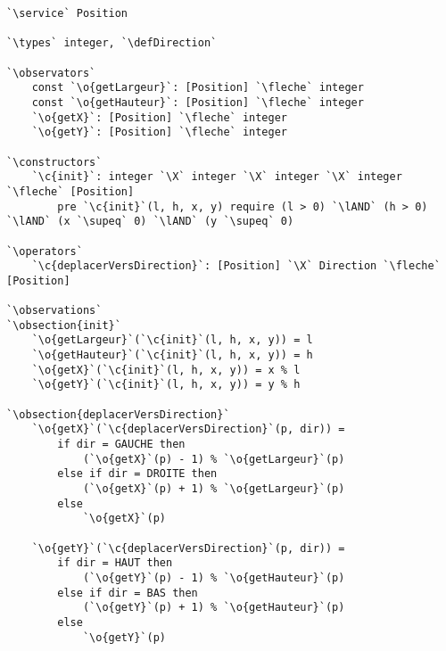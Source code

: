 \documentclass{article}
\newcommand{\fleche}{$\rightarrow{}$}
\newcommand{\X}{$\times{}$}
\newcommand{\supeq}{$\geq$~}
\newcommand{\lAND}{$\land$}
\newcommand{\specsec}[1]{\normalfont{\large{\textbf{#1:}}}}
\newcommand{\service}{\specsec {Service}}
\newcommand{\types}{\specsec {Types}}
\newcommand{\observators}{\specsec {Observators}}
\newcommand{\constructors}{\specsec {Constructors}}
\newcommand{\operators}{\specsec {Operators}}
\newcommand{\observations}{\specsec {Observations}}
\newcommand{\obsection}[1]{\textbf{[#1]}}
\newcommand{\Direction}{Direction}
\newcommand{\defDirection}{\mbox{enum \Direction}~\{~HAUT, BAS, GAUCHE, DROITE~\}}
\renewcommand{\o}[1]{\textcolor{blue}{#1}}
\renewcommand{\c}[1]{\textcolor{red}{#1}}
\begin{document}
\begin{lstlisting}[caption=Position]
`\service` Position

`\types` integer, `\defDirection`

`\observators`
	const `\o{getLargeur}`: [Position] `\fleche` integer
	const `\o{getHauteur}`: [Position] `\fleche` integer
	`\o{getX}`: [Position] `\fleche` integer
	`\o{getY}`: [Position] `\fleche` integer

`\constructors`
	`\c{init}`: integer `\X` integer `\X` integer `\X` integer `\fleche` [Position]
		pre `\c{init}`(l, h, x, y) require (l > 0) `\lAND` (h > 0) `\lAND` (x `\supeq` 0) `\lAND` (y `\supeq` 0)

`\operators`
	`\c{deplacerVersDirection}`: [Position] `\X` Direction `\fleche` [Position]

`\observations`
`\obsection{init}`
	`\o{getLargeur}`(`\c{init}`(l, h, x, y)) = l
	`\o{getHauteur}`(`\c{init}`(l, h, x, y)) = h
	`\o{getX}`(`\c{init}`(l, h, x, y)) = x % l
	`\o{getY}`(`\c{init}`(l, h, x, y)) = y % h

`\obsection{deplacerVersDirection}`
	`\o{getX}`(`\c{deplacerVersDirection}`(p, dir)) =
		if dir = GAUCHE then
			(`\o{getX}`(p) - 1) % `\o{getLargeur}`(p)
		else if dir = DROITE then
			(`\o{getX}`(p) + 1) % `\o{getLargeur}`(p)
		else
			`\o{getX}`(p)

	`\o{getY}`(`\c{deplacerVersDirection}`(p, dir)) =
		if dir = HAUT then
			(`\o{getY}`(p) - 1) % `\o{getHauteur}`(p)
		else if dir = BAS then
			(`\o{getY}`(p) + 1) % `\o{getHauteur}`(p)
		else
			`\o{getY}`(p)
\end{lstlisting}

\clearpage{}
\end{document}
